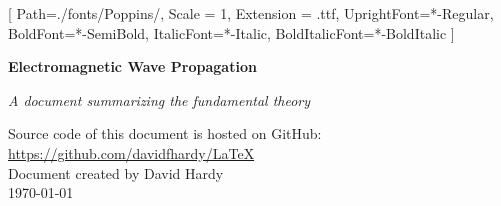 \documentclass[14pt]{extreport}
\begin{document}
\setsansfont{Poppins}[
    Path=./fonts/Poppins/,
    Scale = 1,
    Extension = .ttf,
    UprightFont=*-Regular,
    BoldFont=*-SemiBold,
    ItalicFont=*-Italic,
    BoldItalicFont=*-BoldItalic
    ]

\thispagestyle{empty}
\begin{titlepage}
    \centering
    \vspace*{4cm}
    {\Huge\bfseries Electromagnetic Wave Propagation \par}
    \vspace{0.5cm}
    {\large \textsl{A document summarizing the fundamental theory} \par}
    \vfill
    {Source code of this document is hosted on GitHub:} \\
    \url{https://github.com/davidfhardy/LaTeX} \\[1cm]
    {Document created by David Hardy} \\ 
    {\today} 
\end{titlepage}

\tableofcontents
\thispagestyle{empty}

\clearpage
{}













\printbibliography
\end{document}
